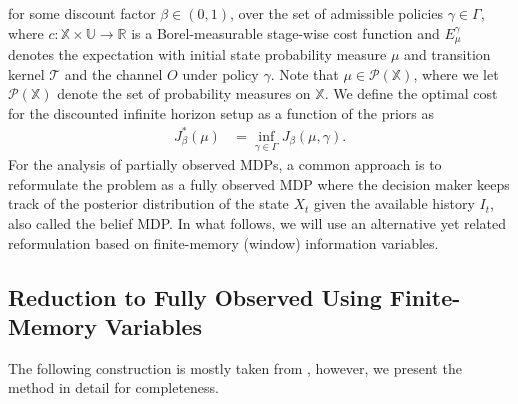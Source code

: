 \documentclass[11pt]{article}
\newcommand{\R}{\mathds{R}}
\begin{document}
 \noindent for some discount factor $\beta \in (0,1)$, over the set of admissible policies $\gamma\in\Gamma$, where $c:\mathds{X}\times\mathds{U}\to\R$ is a Borel-measurable stage-wise cost function and $E_\mu^{\gamma}$ denotes the expectation with initial state probability measure $\mu$ and transition kernel $\mathcal{T}$ and the channel $O$ under policy $\gamma$. Note that $\mu\in\mathcal{P}(\mathds{X})$, where we let $\mathcal{P}(\mathds{X})$ denote the set of probability measures on $\mathds{X}$. We define the optimal cost for the discounted infinite horizon setup as a function of the priors as
\begin{align}\label{opt_val}
  J_{\beta}^*(\mu)&=\inf_{\gamma\in\Gamma} J_{\beta}(\mu,\gamma).
\end{align}
For the analysis of partially observed MDPs, a common approach is to reformulate the problem as a fully observed MDP where the decision maker keeps track of the posterior distribution of the state $X_t$ given the available history $I_t$, also called the belief MDP. In what follows, we will use an alternative yet related reformulation based on finite-memory (window) information variables.






\subsection{Reduction to Fully Observed Using Finite-Memory Variables}\label{finite_memory}
 The following construction  is mostly taken from \cite{kara2023convergence}, however, we present the method in detail for completeness.
\end{document}
